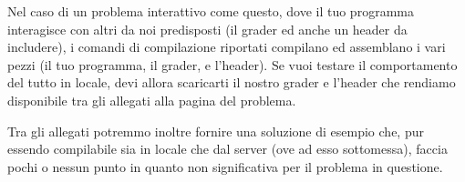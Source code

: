 \documentclass[a4paper,11pt]{article}
\begin{document}
  Nel caso di un problema interattivo come questo,
  dove il tuo programma interagisce con altri da noi predisposti
  (il grader ed anche un header da includere), i comandi di compilazione riportati compilano ed assemblano i vari pezzi (il tuo programma, il grader, e l'header).
  Se vuoi testare il comportamento del tutto in locale,
  devi allora scaricarti il nostro grader e l'header che rendiamo disponibile tra gli allegati alla pagina del problema.

  Tra gli allegati potremmo inoltre fornire una soluzione di esempio che,
  pur essendo compilabile sia in locale che dal server (ove ad esso sottomessa),
  faccia pochi o nessun punto in quanto non significativa per il problema
  in questione.
  
\end{document}
